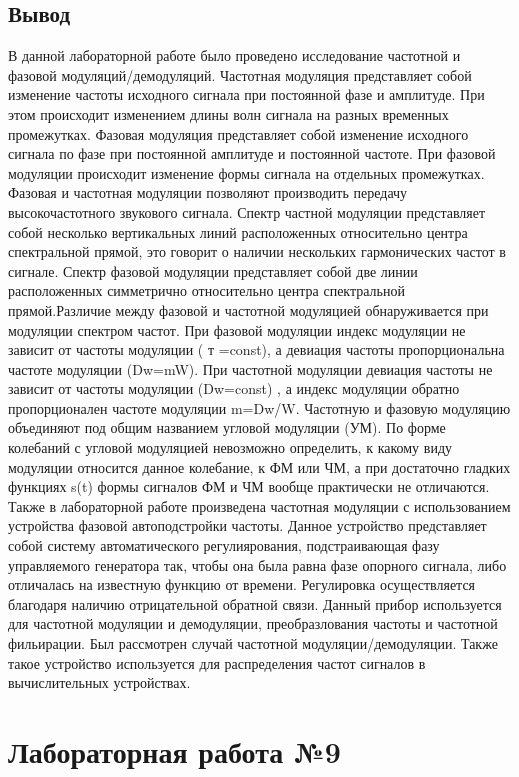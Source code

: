 \documentclass[10pt,a4paper]{report}
\begin{document}
\section{Вывод}
В данной лабораторной работе было проведено исследование частотной и фазовой модуляций/демодуляций. Частотная модуляция представляет собой изменение частоты исходного сигнала
при постоянной фазе и амплитуде. При этом происходит изменением длины волн сигнала на разных временных промежутках. Фазовая модуляция представляет собой изменение исходного
сигнала по фазе при постоянной амплитуде и постоянной частоте. При фазовой модуляции происходит изменение формы сигнала на отдельных промежутках. Фазовая и частотная модуляции
позволяют производить передачу высокочастотного звукового сигнала. Спектр частной модуляции представляет собой несколько вертикальных линий расположенных относительно центра 
спектральной прямой, это говорит о наличии нескольких гармонических частот в сигнале. Спектр фазовой модуляции представляет собой две линии расположенных симметрично относительно центра
спектральной прямой.Различие между фазовой и частотной модуляцией обнаруживается при модуляции спектром частот. При фазовой модуляции индекс модуляции не зависит от частоты модуляции ( т =const), 
а девиация частоты пропорциональна частоте модуляции (Dw=mW). При частотной модуляции девиация частоты не зависит от частоты модуляции (Dw=const) , а индекс модуляции обратно пропорционален частоте модуляции m=Dw/W.
Частотную и фазовую модуляцию объединяют под общим названием угловой модуляции (УМ). По форме колебаний с угловой модуляцией невозможно определить, к какому виду модуляции относится данное колебание,
 к ФМ или ЧМ, а при достаточно гладких функциях s(t) формы сигналов ФМ и ЧМ вообще практически не отличаются. Также в лабораторной работе произведена частотная модуляции с использованием устройства фазовой автоподстройки частоты.
Данное устройство представляет собой систему автоматического регулиярования, подстраивающая фазу управляемого генератора так, чтобы она была равна фазе опорного сигнала, либо отличалась на 
известную функцию от времени. Регулировка осуществляется благодаря наличию отрицательной обратной связи. Данный прибор используется для частотной модуляции и демодуляции, 
преобразлования частоты и частотной фильирации. Был рассмотрен случай частотной модуляции/демодуляции. Также такое устройство используется для распределения частот 
сигналов в вычислительных устройствах. 

\chapter{Лабораторная работа №9}
\end{document}

